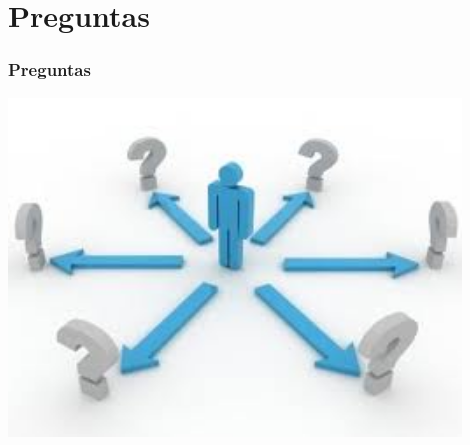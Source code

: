 \documentclass{beamer}
\begin{document}
% 	
% 	
% 	
% 
% 	
\section{Preguntas}
	\begin{frame}
		\frametitle{Preguntas}
		\includegraphics[width = 0.9\textwidth]{preguntas.jpeg}
	\end{frame}
\end{document}
